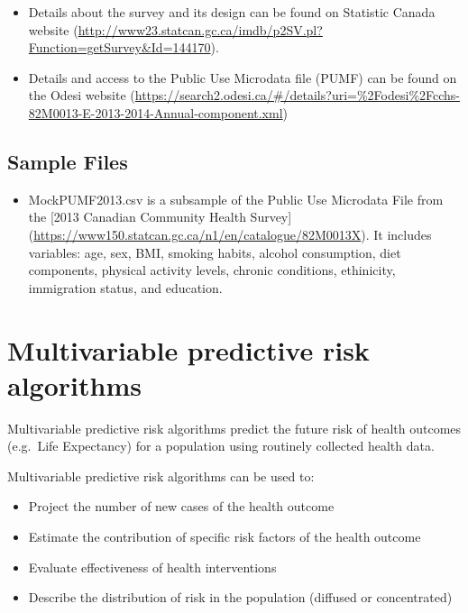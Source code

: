 \documentclass[]{book}
\providecommand{\tightlist}{%
  \setlength{\itemsep}{0pt}\setlength{\parskip}{0pt}}
\begin{document}
\begin{itemize}
\tightlist
\item
  Details about the survey and its design can be found on Statistic
  Canada website
  (\url{http://www23.statcan.gc.ca/imdb/p2SV.pl?Function=getSurvey\&Id=144170}).
\item
  Details and access to the Public Use Microdata file (PUMF) can be
  found on the Odesi website
  (\url{https://search2.odesi.ca/\#/details?uri=\%2Fodesi\%2Fcchs-82M0013-E-2013-2014-Annual-component.xml})
\end{itemize}

\subsection{Sample Files}\label{sample-files}

\begin{itemize}
\tightlist
\item
  MockPUMF2013.csv is a subsample of the Public Use Microdata File from
  the {[}2013 Canadian Community Health Survey{]}
  (\url{https://www150.statcan.gc.ca/n1/en/catalogue/82M0013X}). It
  includes variables: age, sex, BMI, smoking habits, alcohol
  consumption, diet components, physical activity levels, chronic
  conditions, ethinicity, immigration status, and education.
\end{itemize}

\section{Multivariable predictive risk
algorithms}\label{multivariable-predictive-risk-algorithms}

Multivariable predictive risk algorithms predict the future risk of
health outcomes (e.g.~Life Expectancy) for a population using routinely
collected health data.

Multivariable predictive risk algorithms can be used to:

\begin{itemize}
\tightlist
\item
  Project the number of new cases of the health outcome
\item
  Estimate the contribution of specific risk factors of the health
  outcome
\item
  Evaluate effectiveness of health interventions
\item
  Describe the distribution of risk in the population (diffused or
  concentrated)
\end{itemize}
\end{document}
